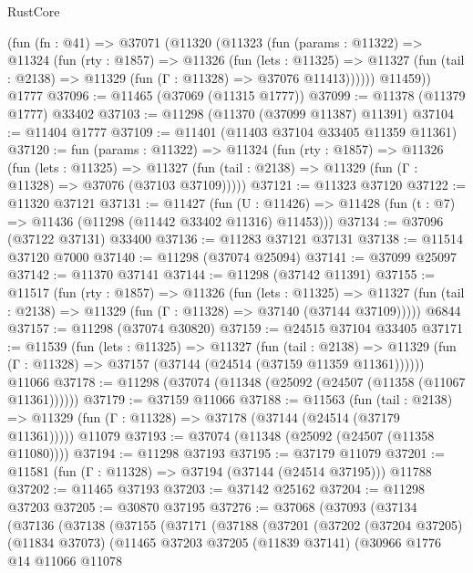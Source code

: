 \begin{lexlean}{RustCore}
\begin{coremodule}
    (fun (fn : @41) =>
    @37071
      (@11320
        (@11323
          (fun (params : @11322) =>
          @11324
            (fun (rty : @1857) =>
            @11326
              (fun (lets : @11325) =>
              @11327 (fun (tail : @2138) => @11329 (fun (Γ : @11328) => @37076 @11413))))))
        @11459))
    @1777
@37096 := @11465 (@37069 (@11315 @1777))
@37099 := @11378 (@11379 @1777) @33402
@37103 := @11298 (@11370 (@37099 @11387) @11391)
@37104 := @11404 @1777
@37109 := @11401 (@11403 @37104 @33405 @11359 @11361)
@37120 := fun (params : @11322) =>
  @11324
    (fun (rty : @1857) =>
    @11326
      (fun (lets : @11325) =>
      @11327 (fun (tail : @2138) => @11329 (fun (Γ : @11328) => @37076 (@37103 @37109)))))
@37121 := @11323 @37120
@37122 := @11320 @37121
@37131 := @11427
    (fun (U : @11426) => @11428 (fun (t : @7) => @11436 (@11298 (@11442 @33402 @11316) @11453)))
@37134 := @37096 (@37122 @37131) @33400
@37136 := @11283 @37121 @37131
@37138 := @11514 @37120 @7000
@37140 := @11298 (@37074 @25094)
@37141 := @37099 @25097
@37142 := @11370 @37141
@37144 := @11298 (@37142 @11391)
@37155 := @11517
    (fun (rty : @1857) =>
    @11326
      (fun (lets : @11325) =>
      @11327 (fun (tail : @2138) => @11329 (fun (Γ : @11328) => @37140 (@37144 @37109)))))
    @6844
@37157 := @11298 (@37074 @30820)
@37159 := @24515 @37104 @33405
@37171 := @11539
    (fun (lets : @11325) =>
    @11327
      (fun (tail : @2138) =>
      @11329 (fun (Γ : @11328) => @37157 (@37144 (@24514 (@37159 @11359 @11361))))))
    @11066
@37178 := @11298 (@37074 (@11348 (@25092 (@24507 (@11358 (@11067 @11361))))))
@37179 := @37159 @11066
@37188 := @11563
    (fun (tail : @2138) => @11329 (fun (Γ : @11328) => @37178 (@37144 (@24514 (@37179 @11361)))))
    @11079
@37193 := @37074 (@11348 (@25092 (@24507 (@11358 @11080))))
@37194 := @11298 @37193
@37195 := @37179 @11079
@37201 := @11581 (fun (Γ : @11328) => @37194 (@37144 (@24514 @37195))) @11788
@37202 := @11465 @37193
@37203 := @37142 @25162
@37204 := @11298 @37203
@37205 := @30870 @37195
@37276 := @37068
    (@37093
      (@37134
        (@37136
          (@37138
            (@37155
              (@37171
                (@37188
                  (@37201
                    (@37202
                      (@37204 @37205)
                      (@11834 @37073)
                      (@11465
                        @37203
                        @37205
                        (@11839 @37141)
                        (@30966
                          @1776
                          @14
                          @11066
                          @11078

\end{coremodule}
\end{lexlean}

